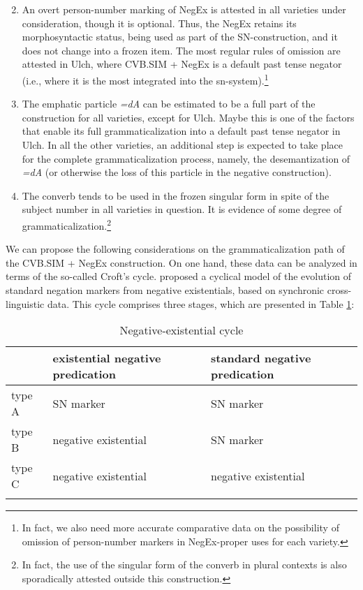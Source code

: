\documentclass[output=paper]{langscibook}
\begin{document}
\begin{enumerate}
    \setcounter{enumi}{1}
    \item An overt person-number marking of NegEx is attested in all varieties under consideration, though it is optional. Thus, the NegEx retains its morphosyntactic status, being used as part of the SN-construction, and it does not change into a frozen item. The most regular rules of omission are attested in Ulch, where CVB.SIM + NegEx is a default past tense negator (i.e., where it is the most integrated into the sn-system).\footnote{In fact, we also need more accurate comparative data on the possibility of omission of person-number markers in NegEx-proper uses for each variety.}
    \item The emphatic particle \textit{=dA} can be estimated to be a full part of the construction for all varieties, except for Ulch. Maybe this is one of the factors that enable its full grammaticalization into a default past tense negator in Ulch. In all the other varieties, an additional step is expected to take place for the complete grammaticalization process, namely, the desemantization of \textit{=dA} (or otherwise the loss of this particle in the negative construction).
    \item The converb tends to be used in the frozen singular form in spite of the subject number in all varieties in question. It is evidence of some degree of grammaticalization.\footnote{In fact, the use of the singular form of the converb in plural contexts is also sporadically attested outside this construction.}
\end{enumerate}

We can propose the following considerations on the grammaticalization path of the CVB.SIM + NegEx construction. On one hand, these data can be analyzed in terms of the so-called Croft’s cycle. \citet{Croft1991} proposed a cyclical model of the evolution of standard negation markers from negative existentials, based on synchronic cross-linguistic data. This cycle comprises three stages, which are presented in Table \ref{tab:T9}:

\begin{table}[!h]
    \caption{Negative-existential cycle \citep{Croft1991}}
    \label{tab:T9}
    \begin{tabular}{@{}lll@{}}
    \lsptoprule
     & existential negative predication & standard negative predication \\ \midrule
    type A & SN marker & SN marker \\
    type B & negative existential & SN marker \\
    type C & negative existential & negative existential\footnotemark \\ \lspbottomrule
    \end{tabular}
\end{table}
\end{document}
